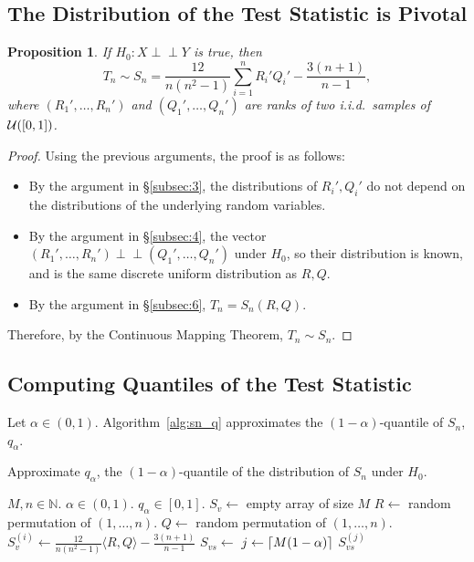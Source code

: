 \documentclass[letterpaper, reqno]{amsart}
\newtheorem{prop}{Proposition}[section]
\numberwithin{equation}{section}
\DeclarePairedDelimiter{\ceil}{\lceil}{\rceil}
\newcommand{\U}[2]{\mathcal{U}\mleft(\mleft[ #1, #2 \mright]\mright)}
\newcommand{\indep}{\perp \!\!\! \perp}  %
\newcommand{\iid}{i.i.d.}
\newcommand{\sumi}[2]{\sum_{#1=1}^{#2}}
\begin{document}
\subsection{The Distribution of the Test Statistic is Pivotal}
\begin{prop}
  If $H_0 \colon X \indep Y$ is true, then
  \[ T_n \sim S_n = \frac{12}{n(n^2 - 1)} \sumi{i}{n} R_i' Q_i' - \frac{3(n+1)}{n-1}, \]
  where $(R_1', \dots, R_n')$ and $(Q_1', \dots, Q_n')$ are ranks of two \iid\
  samples of $\U{0}{1}$.
\end{prop}

\begin{proof}
  Using the previous arguments, the proof is as follows:
  \begin{itemize}
    \item By the argument in \S\ref{subsec:3}, the distributions of $R_i', Q_i'$ do not depend on the distributions of the underlying random variables.
    \item By the argument in \S\ref{subsec:4}, the vector $(R_1', \dots, R_n')
      \indep (Q_1', \dots, Q_n')$ under $H_0$, so their distribution is known,
      and is the same discrete uniform distribution as $R, Q$.
    \item By the argument in \S\ref{subsec:6}, $T_n = S_n(R, Q)$.
  \end{itemize}
  Therefore, by the Continuous Mapping Theorem, $T_n \sim S_n$.
\end{proof}

\subsection{Computing Quantiles of the Test Statistic}
Let $\alpha \in (0, 1)$. Algorithm~\ref{alg:sn_q} approximates the $(1-\alpha)$-quantile
of $S_n$, $q_\alpha$.

\begin{algorithm}[H]
  \caption{Approximate $q_\alpha$, the $(1 - \alpha)$-quantile of the
distribution of $S_n$ under $H_0$.}
  \label{alg:sn_q}
  \begin{algorithmic}
    \Require $M, n \in \mathbb{N}$. $\alpha \in (0, 1)$.
    \Ensure $q_\alpha \in [0, 1]$.
      \State $S_v \gets$ empty array of size $M$
        \State $R \gets$ random permutation of $(1, \dots, n)$.
        \State $Q \gets$ random permutation of $(1, \dots, n)$.
        \State $S_v^{(i)} \gets \frac{12}{n(n^2 - 1)} \langle R, Q \rangle - \frac{3(n+1)}{n-1}$
      \EndFor
      \State $S_{vs} \gets$ 
      \State $j \gets \ceil*{M(1 - \alpha)}$
      \State \Return $S_{vs}^{(j)}$
    \EndProcedure
  \end{algorithmic}
\end{algorithm}
\end{document}
